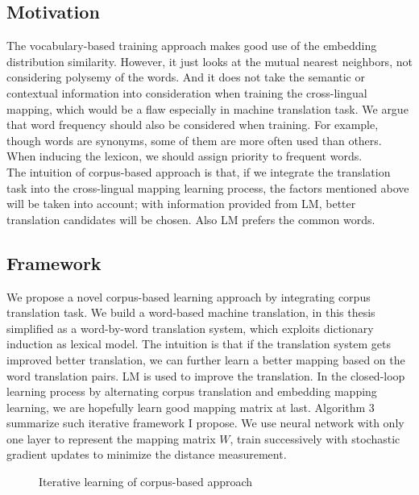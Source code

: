 \subsection{Motivation}
The vocabulary-based training approach makes good use of the  embedding distribution similarity. However, it just looks at the mutual nearest neighbors, not considering polysemy of the words. And it does not take the semantic or contextual information into consideration when training the cross-lingual mapping, which would be a flaw especially in machine translation task. We argue that word frequency should also be considered when training. For example, though words are synonyms, some of them are more often used than others. When inducing the lexicon, we should assign priority to frequent words.\\
The intuition of corpus-based approach is that, if we integrate the translation task into the cross-lingual mapping learning process, the factors mentioned above will be taken into account; with information provided from LM, better translation candidates will be chosen. Also  LM prefers the common words. 
\subsection{Framework}
 We propose a novel corpus-based learning approach by integrating corpus translation task. We build a word-based machine translation, in this thesis simplified as a word-by-word translation system, which exploits dictionary induction as lexical model. The intuition is that if the translation system gets improved better translation, we can further learn a better mapping based on the word translation pairs. LM is used to improve the translation. In the closed-loop learning process by alternating corpus translation and embedding mapping learning, we are hopefully learn good mapping matrix at last. Algorithm 3 summarize such iterative framework I propose. We use neural network with only one layer to represent the mapping matrix $W$, train successively with stochastic gradient updates to minimize the distance measurement.\\
\begin{figure}[H]
	\centering
	\begin{minipage}{.7\linewidth}
		\begin{algorithm}[H]
			\SetAlgoLined
			\caption{Iterative learning of corpus-based approach}
		\end{algorithm}
	\end{minipage}
\end{figure}

